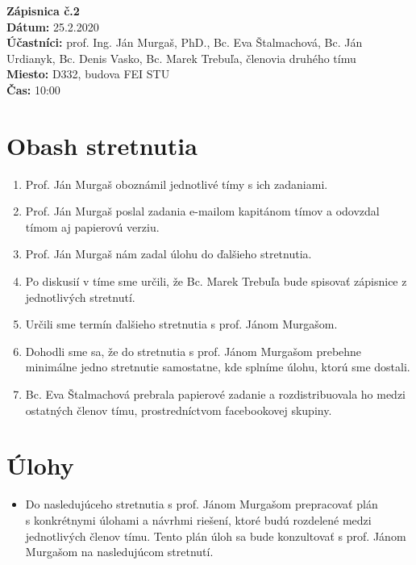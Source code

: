 
\usepackage{parskip}%

	\textbf{{\Huge Zápisnica č.2}}\\
			
	\textbf{Dátum:} 25.2.2020\\	
		
	\textbf{Účastníci:} prof. Ing. Ján Murgaš, PhD., Bc. Eva Štalmachová, Bc. Ján Urdianyk, Bc. Denis Vasko, Bc. Marek Trebuľa, členovia druhého tímu\\
		
	\textbf{Miesto:} D332, budova FEI STU\\	
	
	\textbf{Čas:} 10:00    
    \section*{Obash stretnutia}
    \begin{enumerate}
    	\item Prof. Ján Murgaš oboznámil jednotlivé tímy s ich zadaniami.
    	\item Prof. Ján Murgaš poslal zadania e-mailom kapitánom tímov a odovzdal\\ tímom aj papierovú verziu.
    	\item Prof. Ján Murgaš nám zadal úlohu do ďalšieho stretnutia.
    	\item Po diskusií v tíme sme určili, že Bc. Marek Trebuľa bude spisovať zápisnice z jednotlivých stretnutí.
    	\item Určili sme termín ďalšieho stretnutia s prof. Jánom Murgašom.
    	\item Dohodli sme sa, že do stretnutia s prof. Jánom Murgašom prebehne\\ minimálne jedno stretnutie samostatne, kde splníme úlohu, ktorú sme dostali.
    	\item Bc. Eva Štalmachová prebrala papierové zadanie a rozdistribuovala ho medzi ostatných členov tímu, prostredníctvom facebookovej skupiny.
    	
    \end{enumerate}    
    \section*{Úlohy}
    \begin{itemize}
    	\item Do nasledujúceho stretnutia s prof. Jánom Murgašom prepracovať plán\\ s konkrétnymi úlohami a návrhmi riešení, ktoré budú rozdelené medzi\\ jednotlivých členov tímu. Tento plán úloh sa bude konzultovať s prof. Jánom Murgašom na nasledujúcom stretnutí.
    \end{itemize}

